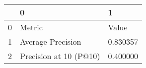 \begin{tabular}{lll}
\toprule
 & 0 & 1 \\
\midrule
0 & Metric & Value \\
1 & Average Precision & 0.830357 \\
2 & Precision at 10 (P@10) & 0.400000 \\
\bottomrule
\end{tabular}
